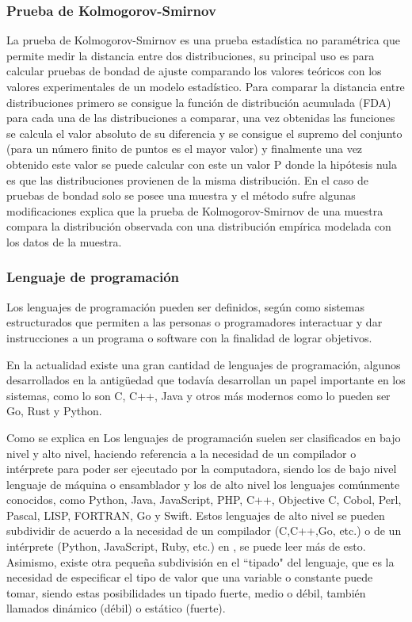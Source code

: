 \subsubsection{Prueba de Kolmogorov-Smirnov}
La prueba de Kolmogorov-Smirnov es una prueba estadística no paramétrica que
permite medir la distancia entre dos distribuciones, su principal uso es para
calcular pruebas de bondad de ajuste comparando los valores teóricos con los
valores experimentales de un modelo estadístico. Para comparar la distancia
entre distribuciones primero se consigue la función de distribución acumulada
(FDA) para cada una de las distribuciones a comparar, una vez obtenidas las
funciones se calcula el valor absoluto de su diferencia y se consigue el
supremo del conjunto (para un número finito de puntos es el mayor valor) y
finalmente una vez obtenido este valor se puede calcular con este un valor P
donde la hipótesis nula es que las distribuciones provienen de la misma
distribución. En el caso de pruebas de bondad solo se posee una muestra y el
método sufre algunas modificaciones \textcite{GregoryW} explica que la prueba de
Kolmogorov-Smirnov de una muestra compara la distribución observada con una
distribución empírica modelada con los datos de la muestra.


\subsubsection{Lenguaje de programación}
Los lenguajes de programación pueden ser definidos, según \textcite{ETAC} como
sistemas estructurados
que permiten a las personas o programadores interactuar y dar instrucciones a un
programa o software con la finalidad de lograr objetivos.

En la actualidad existe una gran cantidad de lenguajes de programación, algunos
desarrollados en la antigüedad que todavía desarrollan un papel importante en
los sistemas, como lo son C, C++, Java y otros más modernos como lo pueden ser
Go, Rust y Python.

Como se explica en \textcite{javaTpoint}
Los lenguajes de programación suelen ser clasificados en bajo nivel y alto nivel,
haciendo referencia a la necesidad de un compilador o intérprete para poder ser
ejecutado por la computadora, siendo los de bajo nivel lenguaje de máquina o
ensamblador y los de alto nivel los lenguajes comúnmente conocidos, como
Python, Java, JavaScript, PHP, C++, Objective C, Cobol, Perl, Pascal, LISP,
FORTRAN, Go y Swift. Estos lenguajes de alto nivel se pueden subdividir
de acuerdo a la necesidad de un compilador (C,C++,Go, etc.) o de un intérprete
(Python, JavaScript, Ruby, etc.) en \textcite{LenguajesCompiladosEInterpretados}, se
puede leer más de esto. Asimismo, existe otra pequeña subdivisión en el ``tipado"
del lenguaje, que es la necesidad de especificar el tipo de valor que una
variable o constante puede tomar, siendo estas posibilidades un tipado fuerte,
medio o débil, también llamados dinámico (débil) o estático (fuerte).


